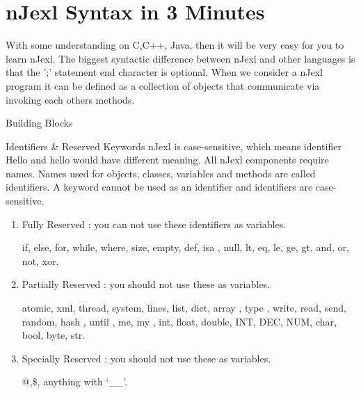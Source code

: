 \chapter{nJexl Syntax in 3 Minutes}\label{intro-njexl}

{\LARGE W}ith some understanding on C,C++, Java, then it will be very easy for you to learn nJexl. The biggest syntactic difference between nJexl and other languages is that the ';' statement end character is optional. When we consider a nJexl program it can be defined as a collection of objects that communicate via invoking each others methods. 


\begin{section}{Building Blocks}

\begin{subsection}{Identifiers \& Reserved Keywords}
nJexl is case-sensitive, which means identifier Hello and hello would have different meaning.
All nJexl components require names. Names used for objects, classes, variables and methods are called identifiers. 
A keyword cannot be used as an identifier and identifiers are case-sensitive. 
\begin{enumerate} 
\item{ Fully Reserved : you can not use these identifiers as variables. 
    \begin{center}
    if, else, for, while, where, size, empty, def, isa , null,
    lt, eq, le, ge, gt, and, or, not, xor.
    \end{center}
}
\item{ Partially Reserved : you should not use these as variables. 
    \begin{center}
    atomic, xml, thread, system, lines, list, dict, array , 
    type , write, read, send, random, hash , until , me, my ,
    int, float, double, INT, DEC, NUM, char, bool, byte, str.
    \end{center}  
}
\item{ Specially Reserved : you should not use these as variables. 
    \begin{center}
    @,\$, anything with `\_\_'.
    \end{center}   
}
\end{enumerate}

\end{subsection}



\end{section}
